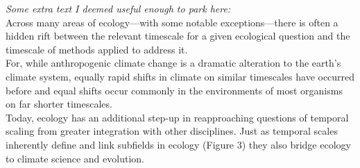 \documentclass[11pt,a4paper,oneside]{article}
\begin{document}
\noindent \emph{Some extra text I deemed useful enough to park here:}\\
Across many areas of ecology---with some notable exceptions---there is often a hidden rift between the relevant timescale for a given ecological question and the timescale of methods applied to address it.\\

For, while anthropogenic climate change is a dramatic alteration to the earth's climate system, equally rapid shifts in climate on similar timescales have occurred before and equal shifts occur commonly in the environments of most organisms on far shorter timescales.\\

Today, ecology has an additional step-up in reapproaching questions of temporal scaling from greater integration with other disciplines. Just as temporal scales inherently define and link subfields in ecology (Figure 3) they also bridge ecology to climate science and evolution. 
\end{document}
